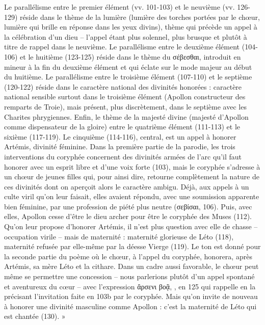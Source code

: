 {Le parallélisme entre le premier élément (vv. 101-103) et le neuvième (vv. 126-129) réside dans le thème de la lumière (lumière des torches portées par le chœur, lumière qui brille en réponse dans les yeux divins), thème qui précède un appel à la célébration d'un dieu – l'appel étant plus solennel, plus brusque et plutôt à titre de rappel dans le neuvième. Le parallélisme entre le deuxième élément (104-106) et le huitième (123-125) réside dans le thème du σέβεσθαι, introduit en mineur à la fin du deuxième élément et qui éclate sur le mode majeur au début du huitième.
Le parallélisme entre le troisième élément (107-110) et le septième (120-122) réside dans le caractère national des divinités honorées : caractère national sensible surtout dans le troisième élément (Apollon constructeur des remparts de Troie), mais présent, plus discrètement, dans le septième avec les Charites phrygiennes.
Enfin, le thème de la majesté divine (majesté d'Apollon comme dispensateur de la gloire) entre le quatrième élément (111-113) et le sixième (117-119). Le cinquième (114-116), central, est un appel à honorer Artémis, divinité féminine. Dans la première partie de la parodie, les trois interventions du coryphée concernent des divinités armées de l'arc qu'il faut honorer avec un esprit libre et d'une voix forte (103), mais le coryphée s'adresse à un chœur de jeunes filles qui, pour ainsi dire, retourne complètement la nature de ces divinités dont on aperçoit alors le caractère ambigu. Déjà, aux appels à un culte viril qu'on leur faisait, elles avaient répondu, avec une soumission apparente bien féminine, par une profession de piété plus neutre (σεβίσαι, 106). Puis, avec elles, Apollon cesse d'être le dieu archer pour être le coryphée des Muses (112). Qu'on leur propose d'honorer Artémis, il n'est plus question avec elle de chasse – occupation virile – mais de maternité : maternité glorieuse de Léto (118), maternité refusée par elle-même par la déesse Vierge (119). Le ton est donné pour la seconde partie du poème où le chœur, à l'appel du coryphée, honorera, après Artémis, sa mère Léto et la cithare. Dans un cadre aussi favorable, le chœur peut même se permettre une concession – nous parlerions plutôt d'un appel spontané et aventureux du cœur – avec l'expression ἄρσενι βοᾷ, , en 125 qui rappelle en la précisant l'invitation faite en 103b par le coryphée. Mais qu'on invite de nouveau à honorer une divinité masculine comme Apollon : c'est la maternité de Léto qui est chantée (130). »\\
}
